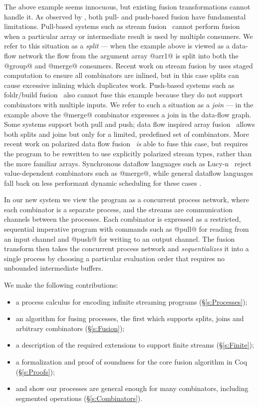 The above example seems innocuous, but existing fusion transformations cannot handle it.
As observed by \citet{kay2009you}, both pull- and push-based fusion have fundamental limitations.
Pull-based systems such as stream fusion~\cite{coutts2007stream} cannot perform fusion when a particular array or intermediate result is used by multiple consumers.
We refer to this situation as a \emph{split} --- when the example above is viewed as a data-flow network the flow from the argument array @arr1@ is split into both the @group@ and @merge@ consumers.
Recent work on stream fusion by \citet{kiselyov2016stream} uses staged computation to ensure all combinators are inlined, but in this case splits can cause excessive inlining which duplicates work.
Push-based systems such as foldr/build fusion~\cite{gill1993short} also cannot fuse this example because they do not support combinators with multiple inputs.
We refer to such a situation as a \emph{join} --- in the example above the @merge@ combinator expresses a join in the data-flow graph.
Some systems support both pull and push; data flow inspired array fusion~\cite{lippmeier2013data} allows both splits and joins but only for a limited, predefined set of combinators.
More recent work on polarized data flow fusion~\cite{lippmeier2016polarized} \emph{is} able to fuse this case, but requires the program to be rewritten to use explicitly polarized stream types, rather than the more familiar arrays.
Synchronous dataflow languages such as Lucy-n~\cite{mandel2010lucy} reject value-dependent combinators such as @merge@, while general dataflow languages fall back on less performant dynamic scheduling for these cases \cite{bouakaz2013real}.

In our new system we view the program as a concurrent process network, where each combinator is a separate process, and the streams are communication channels between the processes. Each combinator is expressed as a restricted, sequential imperative program with commands such as @pull@ for reading from an input channel and @push@ for writing to an output channel. The fusion transform then takes the concurrent process network and \emph{sequentializes} it into a single process by choosing a particular evaluation order that requires no unbounded intermediate buffers. 

We make the following contributions:
\begin{itemize}
\item a process calculus for encoding infinite streaming programs (\S\ref{s:Processes});
\item an algorithm for fusing processes, the first which supports splits, joins and arbitrary combinators (\S\ref{s:Fusion});
\item a description of the required extensions to support finite streams (\S\ref{s:Finite});
\item a formalization and proof of soundness for the core fusion algorithm in Coq (\S\ref{s:Proofs});
\item and show our processes are general enough for many combinators, including segmented operations (\S\ref{s:Combinators}).
\end{itemize}


